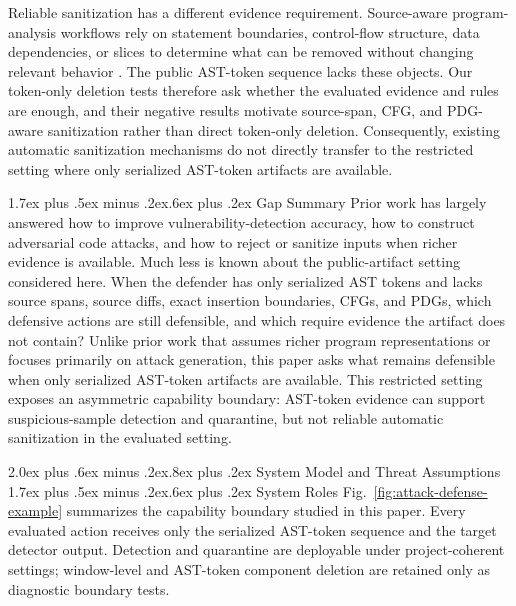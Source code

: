 \documentclass[letterpaper,twocolumn,10pt,twoside]{article}
\makeatletter
\renewcommand\section{\@startsection{section}{1}{\z@}%
  {2.0ex plus .6ex minus .2ex}{.8ex plus .2ex}%
  {\normalfont\large\bfseries}}
\renewcommand\subsection{\@startsection{subsection}{2}{\z@}%
  {1.7ex plus .5ex minus .2ex}{.6ex plus .2ex}%
  {\normalfont\normalsize\bfseries}}
\makeatother
\begin{document}
Reliable sanitization has a different evidence requirement. Source-aware program-analysis workflows rely on statement boundaries, control-flow structure, data dependencies, or slices to determine what can be removed without changing relevant behavior \cite{weiser1984program,ferrante1987pdg}. The public AST-token sequence lacks these objects. Our token-only deletion tests therefore ask whether the evaluated evidence and rules are enough, and their negative results motivate source-span, CFG, and PDG-aware sanitization rather than direct token-only deletion. Consequently, existing automatic sanitization mechanisms do not directly transfer to the restricted setting where only serialized AST-token artifacts are available.

\subsection{Gap Summary}
Prior work has largely answered how to improve vulnerability-detection accuracy, how to construct adversarial code attacks, and how to reject or sanitize inputs when richer evidence is available. Much less is known about the public-artifact setting considered here. When the defender has only serialized AST tokens and lacks source spans, source diffs, exact insertion boundaries, CFGs, and PDGs, which defensive actions are still defensible, and which require evidence the artifact does not contain? Unlike prior work that assumes richer program representations or focuses primarily on attack generation, this paper asks what remains defensible when only serialized AST-token artifacts are available. This restricted setting exposes an asymmetric capability boundary: AST-token evidence can support suspicious-sample detection and quarantine, but not reliable automatic sanitization in the evaluated setting.

\section{System Model and Threat Assumptions}
\subsection{System Roles}
Fig.~\ref{fig:attack-defense-example} summarizes the capability boundary studied in this paper. Every evaluated action receives only the serialized AST-token sequence and the target detector output. Detection and quarantine are deployable under project-coherent settings; window-level and AST-token component deletion are retained only as diagnostic boundary tests.
\end{document}
